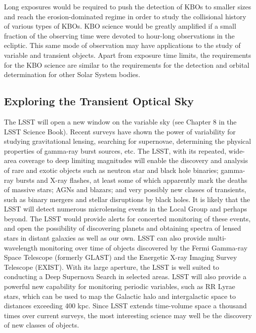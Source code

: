 Long exposures would be required to push the detection of KBOs to smaller
sizes and reach the erosion-dominated regime in order to study the
collisional history of various types of KBOs. KBO science would be greatly
amplified if a small fraction of the observing time were devoted to
hour-long observations in the ecliptic. This same mode of observation may
have applications to the study of variable and transient objects. Apart
from exposure time limits, the requirements for the KBO
science are similar to the requirements for the detection and
orbital determination for other Solar System bodies.



\subsection{Exploring the Transient Optical Sky}
\label{sec:transients}

The LSST will open a new window on the variable sky (see Chapter 8 in
the LSST Science Book). Recent surveys have
shown the power of variability for studying gravitational lensing,
searching for supernovae, determining the physical properties of gamma-ray
burst sources, etc. The LSST, with its repeated, wide-area coverage to deep
limiting magnitudes will enable the discovery and analysis of rare and
exotic objects such as neutron star and black hole binaries; gamma-ray
bursts and X-ray flashes, at least some of which apparently mark the deaths
of massive stars; AGNs and blazars; and very possibly new classes of
transients, such as binary mergers and stellar disruptions by black holes.
It is likely that the LSST will detect
numerous microlensing events in the Local Group and perhaps beyond.  The
LSST would provide alerts for concerted monitoring of these events, and
open the possibility of discovering planets and obtaining spectra of lensed
stars in distant galaxies as well as our own.  LSST can also provide
multi-wavelength monitoring over time of objects discovered by the
Fermi Gamma-ray Space Telescope (formerly GLAST)
and the Energetic X-ray Imaging Survey Telescope (EXIST). With its large aperture, the LSST is well
suited to conducting a Deep Supernova Search in selected areas.  LSST will
also provide a powerful new capability for monitoring periodic variables,
such as RR Lyrae stars, which can be used to map the Galactic halo and
intergalactic space to distances exceeding 400 kpc. Since LSST extends
time-volume space a thousand times over current surveys, the most
interesting science may well be the discovery of new classes of objects.

